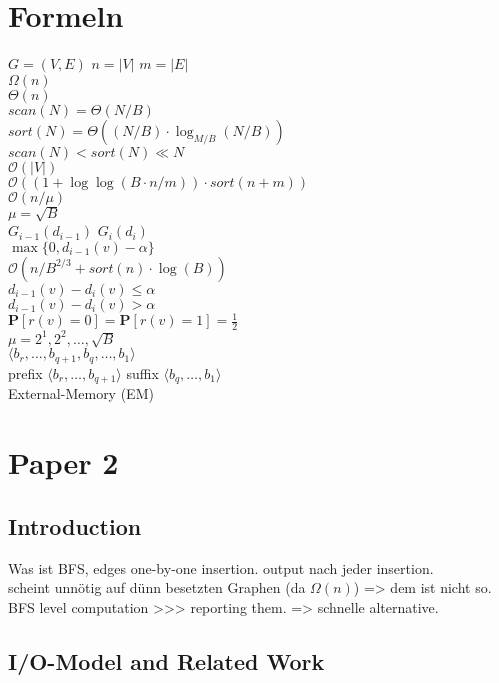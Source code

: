 \documentclass[12pt,a4paper,titlepage,xcolor=dvipsnames]{article}
\begin{document}
\section{Formeln}
$G=(V,E)$ $n=|V|$ $m=|E|$\\
$\Omega (n)$\\
$\Theta(n)$\\
$scan(N)=\Theta(N/B)$\\
$sort(N)=\Theta((N/B)\cdot \log_{M/B}(N/B))$\\
$scan(N)<sort(N)\ll N$\\
$\mathcal{O}(|V|)$\\
$\mathcal{O}((1+\log \log (B\cdot n/m))\cdot sort(n+m))$\\
$\mathcal{O}(n/\mu)$\\
$\mu = \sqrt{B}$\\
$G_{i-1}(d_{i-1})$ $G_i(d_i)$\\
$\max\{0,d_{i-1}(v)-\alpha\}$\\
$\mathcal{O}(n/B^{2/3}+sort(n)\cdot \log(B))$\\
$d_{i-1}(v)-d_i(v)\leq \alpha$\\
$d_{i-1}(v)-d_i(v)> \alpha$\\
$\textbf{P}[r(v)=0]=\textbf{P}[r(v)=1]=\frac{1}{2}$\\
$\mu = 2^1, 2^2,\ldots,\sqrt{B}$\\
$\langle b_r,\ldots,b_{q+1},b_q,\ldots,b_1\rangle$\\
prefix $\langle b_r,\ldots,b_{q+1}\rangle$ suffix $\langle b_q,\ldots,b_1\rangle$\\
External-Memory (EM)\\


\section{Paper 2}
\subsection{Introduction}
Was ist BFS, edges one-by-one insertion. output nach jeder insertion.\\
scheint unnötig auf dünn besetzten Graphen (da $\Omega(n)$) => dem ist nicht so.\\
BFS level computation >>> reporting them. => schnelle alternative.

\subsection{I/O-Model and Related Work}
\end{document}
